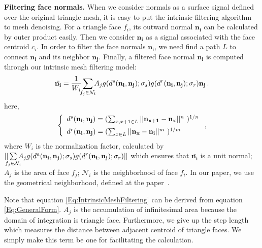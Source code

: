 {\bfseries Filtering face normals.}
When we consider normals as a surface signal defined over the original triangle mesh, it is easy to put the intrinsic filtering algorithm to mesh denoising.
For a triangle face $f_{i}$, its outward normal $\mathbf{n_{i}}$ can be calculated by outer product easily.
Then we consider $\mathbf{n_{i}}$ as a signal associated with the face centroid $c_{i}$.
In order to filter the face normals $\mathbf{n_{i}}$, we need find a path $L$ to connect $\mathbf{n_{i}}$ and its neighbor $\mathbf{n_{j}}$.
Finally, a filtered face normal $\bar{\mathbf{n_{i}}}$ is computed through our intrinsic mesh filtering model:
 \begin{equation}
 \label{Eq:IntrinsicMeshFiltering}
 \bar{\mathbf{n_{i}}} = \frac{1}{W_{i}}\sum_{\mathclap{f_{j}\in\mathcal{N}_{i}}}A_{j}g(d^{s}(\mathbf{n_{i}}, \mathbf{n_{j}}); \sigma_{s})g(d^{r}(\mathbf{n_{i}}, \mathbf{n_{j}}); \sigma_{r})\mathbf{n_{j}}\, .
 \end{equation}
  here,
 \begin{equation}
 \label{eq:IntrinsicMeshDistance}
 \left \{
 \begin{array}{ll}
        d^{s}(\mathbf{n_{i}}, \mathbf{n_{j}}) = (\sum_{x, x+1\in{L}}||\mathbf{n_{x+1}}-\mathbf{n_{x}}||^{n}\,\,)^{1/n} \vspace{1.5mm} \\
        d^{r}(\mathbf{n_{i}}, \mathbf{n_{j}}) = (\sum_{x\in{L}}||\mathbf{n_{x}}-\mathbf{n_{i}}||^{m}\,\,)^{1/m} \\
 \end{array}
 \right. ,
 \end{equation}
where $W_{i}$ is the normalization factor,
calculated by
$||\sum\limits_{\mathclap{f_{j}\in\mathcal{N}_{i}}}A_{j}g(d^{a}(\mathbf{n_{i}}, \mathbf{n_{j}}); \sigma_{s})g(d^{r}(\mathbf{n_{i}}, \mathbf{n_{j}}); \sigma_{r})||$
which ensures that $\bar{\mathbf{n_{i}}}$ is a unit normal;
$A_j$ is the area of face $f_j$;
$\mathcal{N}_{i}$ is the neighborhood of face $f_{i}$.
In our paper, we use the geometrical neighborhood, defined at the paper~\cite{Zhang2015Filter}.

Note that equation \ref{Eq:IntrinsicMeshFiltering} can be derived from equation \ref{Eq:GeneralForm}.
$A_j$ is the accumulation of infinitesimal area because the domain of integration is triangle face.
Furthermore, we give up the step length which measures the distance between adjacent centroid of triangle faces. %
We simply make this term be one for facilitating the calculation.

